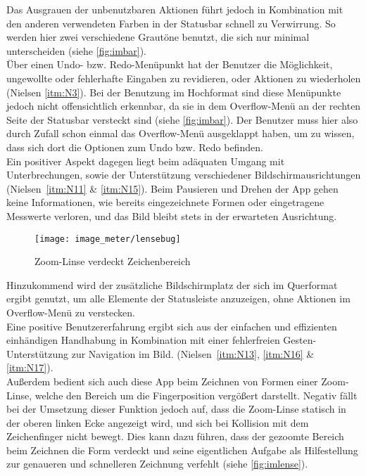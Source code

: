 Das Ausgrauen der unbenutzbaren Aktionen führt jedoch in Kombination mit den anderen verwendeten Farben in der Statusbar schnell zu Verwirrung.
So werden hier zwei verschiedene Grautöne benutzt, die sich nur minimal unterscheiden (siehe \autoref{fig:imbar}).  \\

Über einen Undo- bzw. Redo-Menüpunkt hat der Benutzer die Möglichkeit, ungewollte oder fehlerhafte Eingaben zu revidieren, oder Aktionen zu wiederholen (Nielsen \autoref{itm:N3}).
Bei der Benutzung im Hochformat sind diese Menüpunkte jedoch nicht offensichtlich erkennbar, da sie in dem Overflow-Menü  an der rechten Seite der Statusbar versteckt sind (siehe \autoref{fig:imbar}).
Der Benutzer muss hier also durch Zufall schon einmal das Overflow-Menü ausgeklappt haben, um zu wissen, dass sich dort die Optionen zum Undo bzw. Redo befinden. \\

Ein positiver Aspekt dagegen liegt beim adäquaten Umgang mit Unterbrechungen, sowie der Unterstützung verschiedener Bildschirmausrichtungen (Nielsen~\autoref{itm:N11} \& \autoref{itm:N15}).
Beim Pausieren und Drehen der App gehen keine Informationen, wie bereits eingezeichnete Formen oder eingetragene Messwerte verloren, und das Bild bleibt stets in der erwarteten Ausrichtung. 

\begin{wrapfigure}{R}{0.5\textwidth}
  \centering
  \texttt{[image: image\_meter/lensebug]}
  \caption{Zoom-Linse verdeckt Zeichenbereich}
  \label{fig:imlense}
\end{wrapfigure}

Hinzukommend wird der zusätzliche Bildschirmplatz der sich im Querformat ergibt genutzt, um alle Elemente der Statusleiste anzuzeigen, ohne Aktionen im Overflow-Menü zu verstecken. \\

Eine positive Benutzererfahrung ergibt sich aus der einfachen und effizienten einhändigen Handhabung in Kombination mit einer fehlerfreien Gesten-Unterstützung zur Navigation im Bild. (Nielsen~\autoref{itm:N13}, \autoref{itm:N16} \& \autoref{itm:N17}). \\

Außerdem bedient sich auch diese App beim Zeichnen von Formen einer Zoom-Linse, welche den Bereich um die Fingerposition vergößert darstellt.
Negativ fällt bei der Umsetzung dieser Funktion jedoch auf, dass die Zoom-Linse statisch in der oberen linken Ecke angezeigt wird, und sich bei Kollision mit dem Zeichenfinger nicht bewegt.
Dies kann dazu führen, dass der gezoomte Bereich beim Zeichnen die Form verdeckt und seine eigentlichen Aufgabe als Hilfestellung zur genaueren und schnelleren Zeichnung verfehlt (siehe \autoref{fig:imlense}). \\

